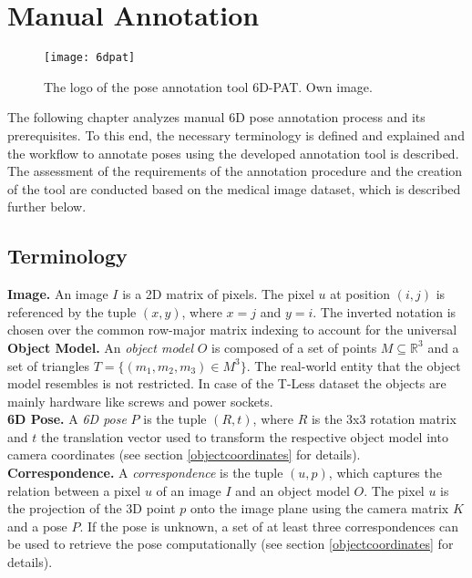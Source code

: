 \chapter{Manual Annotation} \label{chapter:image_pose_annotation}

\begin{figure}[!tbp]
	\centering
    \texttt{[image: 6dpat]}
    \caption{The logo of the pose annotation tool 6D-PAT. Own image.}
    	\label{fig:6dpat_logo}
\end{figure} 

The following chapter analyzes manual 6D pose annotation process and its prerequisites. To this end, the necessary terminology is defined and explained and the workflow to annotate poses using the developed annotation tool is described. The assessment of the requirements of the annotation procedure and the creation of the tool are conducted based on the medical image dataset, which is described further below.

\section{Terminology}

\textbf{Image.} An image $I$ is a 2D matrix of pixels. The pixel $u$ at position $(i, j)$ is referenced by the tuple $(x, y)$, where $x = j$ and $y = i$. The inverted notation is chosen over the common row-major matrix indexing to account for the universal  \\

\noindent\textbf{Object Model.} An \textit{object model} $O$ is composed of a set of points $M \subseteq \mathbb{R}^3$ and a set of triangles $T = \{(m_1, m_2, m_3) \in M^3\}$. The real-world entity that the object model resembles is not restricted. In case of the T-Less dataset \cite{tless} the objects are mainly hardware like screws and power sockets. \\

\noindent\textbf{6D Pose.} A \textit{6D pose} $P$ is the tuple $(R, t)$, where $R$ is the 3x3 rotation matrix and $t$ the translation vector used to transform the respective object model into camera coordinates (see section \ref{objectcoordinates} for details). \\

\noindent\textbf{Correspondence.} A \textit{correspondence} is the tuple $(u, p)$, which captures the relation between a pixel $u$ of an image $I$ and an object model $O$. The pixel $u$ is the projection of the 3D point $p$ onto the image plane using the camera matrix $K$ and a pose $P$. If the pose is unknown, a set of at least three correspondences can be used to retrieve the pose computationally (see section \ref{objectcoordinates} for details). \\

